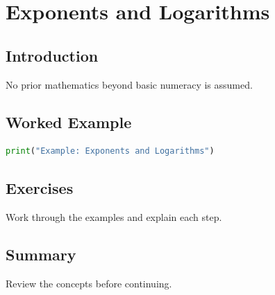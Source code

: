 \chapter{Exponents and Logarithms}
\label{chap:vol4-5}



\section{Introduction}
No prior mathematics beyond basic numeracy is assumed.

\section{Worked Example}
\begin{lstlisting}[language=Python]
print("Example: Exponents and Logarithms")
\end{lstlisting}

\section{Exercises}
\begin{exercise}
Work through the examples and explain each step.
\end{exercise}

\section{Summary}
Review the concepts before continuing.
